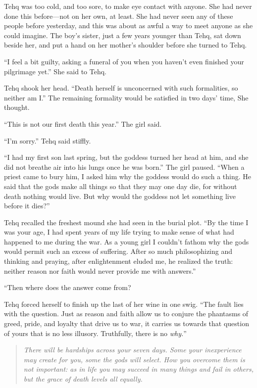 Tehq was too cold, and too sore, to make eye contact with anyone. She had never done this before---not on her own, at least. She had never seen any of these people before yesterday, and this was about as awful a way to meet anyone as she could imagine. The boy's sister, just a few years younger than Tehq, sat down beside her, and put a hand on her mother's shoulder before she turned to Tehq.

``I feel a bit guilty, asking a funeral of you when you haven't even finished your pilgrimage yet.'' She said to Tehq.

Tehq shook her head. ``Death herself is unconcerned with such formalities, so neither am I.'' The remaining formality would be satisfied in two days' time, She thought.

``This is not our first death this year.'' The girl said.

``I'm sorry.'' Tehq said stiffly.

``I had my first son last spring, but the goddess turned her head at him, and she did not breathe air into his lungs once he was born.'' The girl paused. ``When a priest came to bury him, I asked him why the goddess would do such a thing. He said that the gods make all things so that they may one day die, for without death nothing would live. But why would the goddess not let something live before it dies?''

Tehq recalled the freshest mound she had seen in the burial plot. ``By the time I was your age, I had spent years of my life trying to make sense of what had happened to me during the war. As a young girl I couldn't fathom why the gods would permit such an excess of suffering. After so much philosophizing and thinking and praying, after enlightenment eluded me, he realized the truth: neither reason nor faith would never provide me with answers.''

``Then where does the answer come from?

Tehq forced herself to finish up the last of her wine in one swig. ``The fault lies with the question. Just as reason and faith allow us to conjure the phantasms of greed, pride, and loyalty that drive us to war, it carries us towards that question of yours that is no less illusory. Truthfully, there is no \emph{why.}''

\begin{quote}
\emph{There will be hardships across your seven days. Some your inexperience may create for you, some the gods will select. How you overcome them is not important: as in life you may succeed in many things and fail in others, but the grace of death levels all equally.}
\end{quote}

